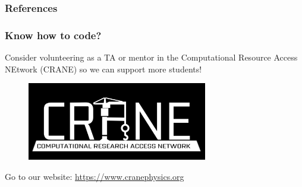 \documentclass[9pt]{beamer}
\begin{document}





\begin{frame}[allowframebreaks]
  \frametitle{References}
  
  {\footnotesize  }

\end{frame}

\appendix

\begin{frame}
    \frametitle{Know how to code?}
    Consider volunteering as a TA or mentor in the Computational Resource Access NEtwork (CRANE) so we can support more students!
    \begin{figure}
        \centering
        \includegraphics[width=0.7\textwidth]{images/CRANE_logo_inverted.png}
    \end{figure}
    Go to our website: \url{https://www.cranephysics.org}
\end{frame}

\end{document}
